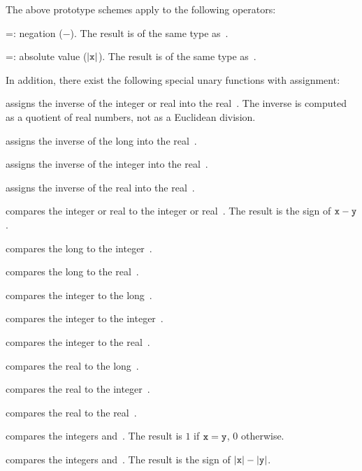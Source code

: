 \noindent The above prototype schemes apply to the following operators:

\op=: negation ($-$). The result is of the same type
as~.

\op=: absolute value ($|{\tt x}|$). The result is of the same type
as~.

\noindent In addition, there exist the following special unary functions with
assignment:

 assigns the inverse of the integer or
real  into the real~. The inverse is computed as a quotient
of real numbers, not as a Euclidean division.

 assigns the inverse of the long 
into the real~.

 assigns the inverse of the integer 
into the real~.

 assigns the inverse of the real  into
the real~.


 compares the integer or real  to the
integer or real~. The result is the sign of ${\tt x}-{\tt y}$.

 compares the long  to the
integer~.

 compares the long  to the real~.

 compares the integer  to the
long~.

 compares the integer  to the
integer~.

 compares the integer  to the
real~.

 compares the real  to the
long~.

 compares the real  to the
integer~.

 compares the real  to the real~.

 compares the integers  and~.
The result is $1$ if ${\tt x} = {\tt y}$, $0$ otherwise.

 compares the integers  and~.
The result is the sign of $|{\tt x}| - |{\tt y}|$.

